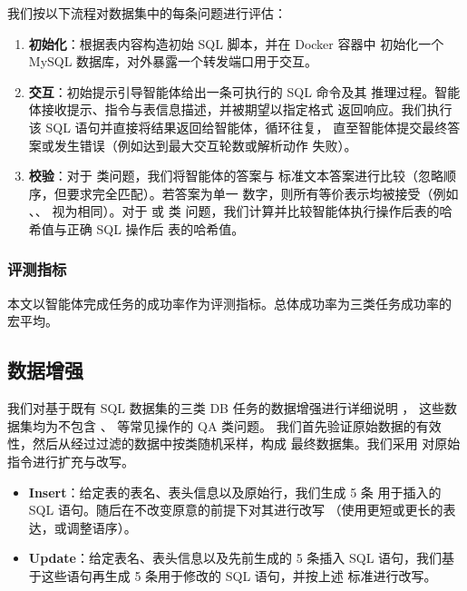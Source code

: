 我们按以下流程对数据集中的每条问题进行评估：
\begin{enumerate}
    \item \textbf{初始化}：根据表内容构造初始 SQL 脚本，并在 Docker 容器中
          初始化一个 MySQL 数据库，对外暴露一个转发端口用于交互。
    \item \textbf{交互}：初始提示引导智能体给出一条可执行的 SQL 命令及其
          推理过程。智能体接收提示、指令与表信息描述，并被期望以指定格式
          返回响应。我们执行该 SQL 语句并直接将结果返回给智能体，循环往复，
          直至智能体提交最终答案或发生错误（例如达到最大交互轮数或解析动作
          失败）。
    \item \textbf{校验}：对于  类问题，我们将智能体的答案与
          标准文本答案进行比较（忽略顺序，但要求完全匹配）。若答案为单一
          数字，则所有等价表示均被接受（例如 、、
           视为相同）。对于  或  类
          问题，我们计算并比较智能体执行操作后表的哈希值与正确 SQL 操作后
          表的哈希值。
\end{enumerate}

\subsubsection*{评测指标}

本文以智能体完成任务的成功率作为评测指标。总体成功率为三类任务成功率的
宏平均。

\subsection{数据增强}

我们对基于既有 SQL 数据集的三类 DB 任务的数据增强进行详细说明
\citep{zhong2017,pasupat2015,iyyer2017,chen2020hybridqa,nan2021fetaqa}，
这些数据集均为不包含 、 等常见操作的 QA 类问题。
我们首先验证原始数据的有效性，然后从经过过滤的数据中按类随机采样，构成
最终数据集。我们采用  对原始指令进行扩充与改写。
\begin{itemize}
    \item \textbf{Insert}：给定表的表名、表头信息以及原始行，我们生成 5 条
          用于插入的 SQL 语句。随后在不改变原意的前提下对其进行改写
          （使用更短或更长的表达，或调整语序）。
    \item \textbf{Update}：给定表名、表头信息以及先前生成的 5 条插入 SQL
          语句，我们基于这些语句再生成 5 条用于修改的 SQL 语句，并按上述
          标准进行改写。
\end{itemize}

